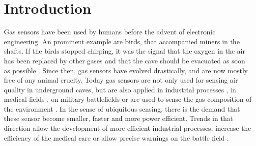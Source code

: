 \section{Introduction}
\label{sec:introduction}

Gas sensors have been used by humans before the advent of electronic engineering. An prominent example are birds, that accompanied miners in the shafts. If the birds stopped chirping, it was the signal that the oxygen in the air has been replaced by other gases and that the cave should be evacuated as soon as possible \cite{nrc1991}. Since then, gas sensors have evolved drastically, and are now mostly free of any animal cruelty. Today gas sensors are not only used for sensing air quality in underground caves, but are also applied in industrial processes \cite{Johny2016, Wang2017}, in medical fields \cite{Eamsaard2016, Wilson2018}, on military battlefields \cite{Kumar2020a} or are used to sense the gas composition of the environment \cite{Harrou2018}. In the sense of ubiquitous sensing, there is the demand that these sensor become smaller, faster and more power efficient. Trends in that direction allow the development of more efficient industrial processes, increase the efficiency of the medical care or allow precise warnings on the battle field \cite{Wang2022, Kumar2020, Mathew2021}.
